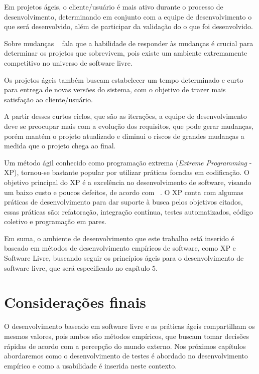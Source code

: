 Em projetos ágeis, o cliente/usuário é mais ativo durante o processo de desenvolvimento, determinando em conjunto com a equipe de desenvolvimento o que será desenvolvido, além de participar da validação do o que foi desenvolvido.

Sobre mudanças ~ fala que a habilidade de responder às mudanças é crucial para determinar os projetos que sobrevivem, pois existe um ambiente extremamente competitivo no universo de software livre.

Os projetos ágeis também buscam estabelecer um tempo determinado e curto para entrega de novas versões do sistema, com o objetivo de trazer mais satisfação ao cliente/usuário.

A partir desses curtos ciclos, que são as iterações, a equipe de desenvolvimento 
deve se preocupar mais com a evolução dos requisitos, que pode gerar mudanças, porém 
mantém o projeto atualizado e diminui o riscos de grandes mudanças a medida que o 
projeto chega ao final.

Um método ágil conhecido como programação extrema (\emph{Extreme Programming} - XP), 
tornou-se bastante popular por utilizar práticas focadas em codificação.
%
O objetivo principal do XP é a excelência no desenvolvimento de software, visando 
um baixo custo e poucos defeitos, de acordo com ~. O XP conta com algumas práticas de desenvolvimento para dar suporte à busca pelos objetivos citados, essas práticas são: refatoração, integração contínua, testes automatizados, código coletivo e programação em pares.

Em suma, o ambiente de desenvolvimento que este trabalho está inserido é baseado em métodos de desenvolvimento empíricos de software, como XP e Software Livre, buscando seguir os princípios ágeis para o desenvolvimento de software livre, que será especificado no capítulo 5.


\section{Considerações finais}

O desenvolvimento baseado em software livre e as práticas ágeis compartilham os mesmos valores, pois ambos são métodos empíricos, que buscam tomar decisões rápidas de acordo com a percepção do mundo externo. Nos próximos capítulos abordaremos como o desenvolvimento de testes é abordado no desenvolvimento empírico e como a usabilidade é inserida neste contexto.


